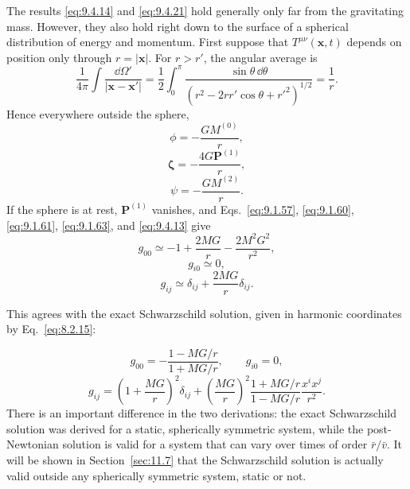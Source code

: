 The results \eqref{eq:9.4.14} and \eqref{eq:9.4.21} hold generally only
far from the gravitating mass. However, they also hold right down to the
surface of a spherical distribution of energy and momentum. First suppose
that \(T^{\mu\nu}(\mathbf x,t)\) depends on position only through
\(r=|\mathbf x|\). For \(r>r'\), the angular average is
\[
  \frac1{4\pi}\int\frac{\dd\Omega'}{|\mathbf x-\mathbf x'|}
  =
  \frac12\int_0^\pi
  \frac{\sin\theta\,\dd\theta}
  {(r^2-2rr'\cos\theta+r'^2)^{1/2}}
  =
  \frac1r.
\]
Hence everywhere outside the sphere,
\begin{equation}
  \phi=-\frac{GM^{(0)}}r,
  \tag{9.4.22}\label{eq:9.4.22}
\end{equation}
\begin{equation}
  \boldsymbol\zeta=-\frac{4G\mathbf P^{(1)}}r,
  \tag{9.4.23}\label{eq:9.4.23}
\end{equation}
\begin{equation}
  \psi=-\frac{GM^{(2)}}r.
  \tag{9.4.24}\label{eq:9.4.24}
\end{equation}
If the sphere is at rest, \(\mathbf P^{(1)}\) vanishes, and
Eqs.~\eqref{eq:9.1.57}, \eqref{eq:9.1.60}, \eqref{eq:9.1.61},
\eqref{eq:9.1.63}, and \eqref{eq:9.4.13} give
\begin{equation}
  g_{00}\simeq
  -1+\frac{2MG}{r}-\frac{2M^2G^2}{r^2},
  \tag{9.4.25}\label{eq:9.4.25}
\end{equation}
\begin{equation}
  g_{i0}\simeq0,
  \tag{9.4.26}\label{eq:9.4.26}
\end{equation}
\begin{equation}
  g_{ij}\simeq
  \delta_{ij}+\frac{2MG}{r}\delta_{ij}.
  \tag{9.4.27}\label{eq:9.4.27}
\end{equation}
{\setlength{\emergencystretch}{1em}%
This agrees with the exact Schwarzschild solution, given in harmonic
coordinates by Eq.~\eqref{eq:8.2.15}:\par}
\[
  g_{00}=-\frac{1-MG/r}{1+MG/r},
  \qquad
  g_{i0}=0,
\]
\[
  g_{ij}
  =
  \left(1+\frac{MG}{r}\right)^2\delta_{ij}
  {}+
  \left(\frac{MG}{r}\right)^2
  \frac{1+MG/r}{1-MG/r}\frac{x^ix^j}{r^2}.
\]
There is an important difference in the two derivations: the exact
Schwarzschild solution was derived for a static, spherically symmetric
system, while the post-Newtonian solution is valid for a system that can
vary over times of order \(\bar r/\bar v\). It will be shown in
Section~\ref{sec:11.7} that the Schwarzschild solution is actually valid
outside any spherically symmetric system, static or not.

